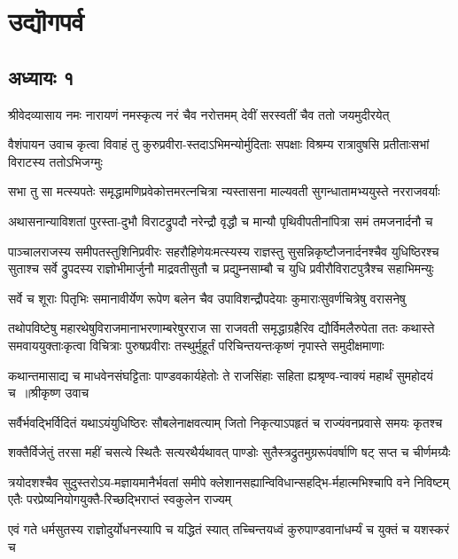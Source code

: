 \part{उद्यॊगपर्व}
\chapter{अध्यायः १}
\threelineshloka
{श्रीवेदव्यासाय नमः}
{नारायणं नमस्कृत्य नरं चैव नरोत्तमम्}
{देवीं सरस्वतीं चैव ततो जयमुदीरयेत्}


\threelineshloka
{वैशंपायन उवाच}
{कृत्वा विवाहं तु कुरुप्रवीरा-स्तदाऽभिमन्योर्मुदिताः सपक्षाः}
{विश्रम्य रात्रावुषसि प्रतीताःसभां विराटस्य ततोऽभिजग्मुः}


\twolineshloka
{सभा तु सा मत्स्यपतेः समृद्धामणिप्रवेकोत्तमरत्नचित्रा}
{न्यस्तासना माल्यवती सुगन्धातामभ्ययुस्ते नरराजवर्याः}


\twolineshloka
{अथासनान्याविशतां पुरस्ता-दुभौ विराटद्रुपदौ नरेन्द्रौ}
{वृद्धौ च मान्यौ पृथिवीपतीनांपित्रा समं तमजनार्दनौ च}


पाञ्चालराजस्य समीपतस्तुशिनिप्रवीरः सहरौहिणेयःमत्स्यस्य राज्ञस्तु सुसन्निकृष्टौजनार्दनश्चैव युधिष्ठिरश्च
\twolineshloka
{सुताश्च सर्वे द्रुपदस्य राज्ञोभीमार्जुनौ माद्रवतीसुतौ च}
{प्रद्युम्नसाम्बौ च युधि प्रवीरौविराटपुत्रैश्च सहाभिमन्युः}


\twolineshloka
{सर्वे च शूराः पितृभिः समानावीर्येण रूपेण बलेन चैव}
{उपाविशन्द्रौपदेयाः कुमाराःसुवर्णचित्रेषु वरासनेषु}


तथोपविष्टेषु महारथेषुविराजमानाभरणाम्बरेषुरराज सा राजवती समृद्धाग्रहैरिव द्यौर्विमलैरुपेता
\twolineshloka
{ततः कथास्ते समवाययुक्ताःकृत्वा विचित्राः पुरुषप्रवीराः}
{तस्थुर्मुहूर्तं परिचिन्तयन्तःकृष्णं नृपास्ते समुदीक्षमाणाः}


\threelineshloka
{कथान्तमासाद्य च माधवेनसंघट्टिताः पाण्डवकार्यहेतोः}
{ते राजसिंहाः सहिता ह्यश्रृण्व-न्वाक्यं महार्थं सुमहोदयं च ॥श्रीकृष्ण उवाच}
{}


\twolineshloka
{सर्वैर्भवद्भिर्विदितं यथाऽयंयुधिष्ठिरः सौबलेनाक्षवत्याम्}
{जितो निकृत्याऽपहृतं च राज्यंवनप्रवासे समयः कृतश्च}


\twolineshloka
{शक्तैर्विजेतुं तरसा महीं चसत्ये स्थितैः सत्यरथैर्यथावत्}
{पाण्डोः सुतैस्त्रद्रुतमुग्ररूपंवर्षाणि षट् सप्त च चीर्णमग्र्यैः}


\threelineshloka
{त्रयोदशश्चैव सुदुस्तरोऽय-मज्ञायमानैर्भवतां समीपे}
{क्लेशानसह्यान्विविधान्सहद्भि-र्महात्मभिश्चापि वने निविष्टम्}
{एतैः परप्रेष्यनियोगयुक्तै-रिच्छद्भिराप्तं स्वकुलेन राज्यम्}


\twolineshloka
{एवं गते धर्मसुतस्य राज्ञोदुर्योधनस्यापि च यद्धितं स्यात्}
{तच्चिन्तयध्वं कुरुपाण्डवानांधर्म्यं च युक्तं च यशस्करं च}



